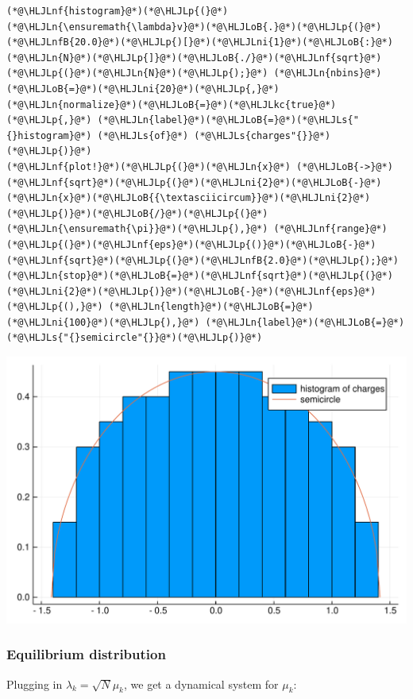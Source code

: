 \documentclass[12pt,a4paper]{article}
\newcommand{\HLJLkc}[1]{\textcolor[RGB]{59,151,46}{\textit{#1}}}
\newcommand{\HLJLn}[1]{#1}
\newcommand{\HLJLnf}[1]{\textcolor[RGB]{66,102,213}{#1}}
\newcommand{\HLJLs}[1]{\textcolor[RGB]{201,61,57}{#1}}
\newcommand{\HLJLnfB}[1]{\textcolor[RGB]{59,151,46}{#1}}
\newcommand{\HLJLni}[1]{\textcolor[RGB]{59,151,46}{#1}}
\newcommand{\HLJLoB}[1]{\textcolor[RGB]{102,102,102}{\textbf{#1}}}
\newcommand{\HLJLp}[1]{#1}
\begin{document}
\begin{lstlisting}
(*@\HLJLnf{histogram}@*)(*@\HLJLp{(}@*)(*@\HLJLn{\ensuremath{\lambda}v}@*)(*@\HLJLoB{.}@*)(*@\HLJLp{(}@*)(*@\HLJLnfB{20.0}@*)(*@\HLJLp{)[}@*)(*@\HLJLni{1}@*)(*@\HLJLoB{:}@*)(*@\HLJLn{N}@*)(*@\HLJLp{]}@*)(*@\HLJLoB{./}@*)(*@\HLJLnf{sqrt}@*)(*@\HLJLp{(}@*)(*@\HLJLn{N}@*)(*@\HLJLp{);}@*) (*@\HLJLn{nbins}@*)(*@\HLJLoB{=}@*)(*@\HLJLni{20}@*)(*@\HLJLp{,}@*) (*@\HLJLn{normalize}@*)(*@\HLJLoB{=}@*)(*@\HLJLkc{true}@*)(*@\HLJLp{,}@*) (*@\HLJLn{label}@*)(*@\HLJLoB{=}@*)(*@\HLJLs{"{}histogram}@*) (*@\HLJLs{of}@*) (*@\HLJLs{charges"{}}@*)(*@\HLJLp{)}@*)
(*@\HLJLnf{plot!}@*)(*@\HLJLp{(}@*)(*@\HLJLn{x}@*) (*@\HLJLoB{->}@*) (*@\HLJLnf{sqrt}@*)(*@\HLJLp{(}@*)(*@\HLJLni{2}@*)(*@\HLJLoB{-}@*)(*@\HLJLn{x}@*)(*@\HLJLoB{{\textasciicircum}}@*)(*@\HLJLni{2}@*)(*@\HLJLp{)}@*)(*@\HLJLoB{/}@*)(*@\HLJLp{(}@*)(*@\HLJLn{\ensuremath{\pi}}@*)(*@\HLJLp{),}@*) (*@\HLJLnf{range}@*)(*@\HLJLp{(}@*)(*@\HLJLnf{eps}@*)(*@\HLJLp{()}@*)(*@\HLJLoB{-}@*)(*@\HLJLnf{sqrt}@*)(*@\HLJLp{(}@*)(*@\HLJLnfB{2.0}@*)(*@\HLJLp{);}@*) (*@\HLJLn{stop}@*)(*@\HLJLoB{=}@*)(*@\HLJLnf{sqrt}@*)(*@\HLJLp{(}@*)(*@\HLJLni{2}@*)(*@\HLJLp{)}@*)(*@\HLJLoB{-}@*)(*@\HLJLnf{eps}@*)(*@\HLJLp{(),}@*) (*@\HLJLn{length}@*)(*@\HLJLoB{=}@*)(*@\HLJLni{100}@*)(*@\HLJLp{),}@*) (*@\HLJLn{label}@*)(*@\HLJLoB{=}@*)(*@\HLJLs{"{}semicircle"{}}@*)(*@\HLJLp{)}@*)
\end{lstlisting}

\includegraphics[width=\linewidth]{figures/Lecture16_6_1.pdf}

\subsubsection{Equilibrium distribution}
Plugging in $\lambda_k = \sqrt N \mu_k$, we get a dynamical system for $\mu_k$:
\end{document}
